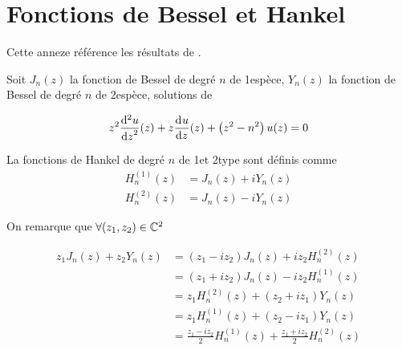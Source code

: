 \section{Fonctions de Bessel et Hankel}

Cette anneze référence les résultats de \cite{abramowitz_handbook_1964}.

Soit \(J_n(z)\) la fonction de Bessel de degré \(n\) de 1\iere espèce, \(Y_n(z)\) la fonction de Bessel de degré \(n\) de 2\ieme espèce, solutions de

\begin{equation}
    z^2 \ddp[2]{z}{u}(z) + z\ddp{z}{u}(z)+\left(z^2-n^2\right)u(z) = 0
\end{equation}

La fonctions de Hankel de degré \(n\) de 1\iere et 2\ieme type sont définis comme
\begin{align}
    H_n^{(1)}(z) &= J_n(z) + iY_n(z)\\
    H_n^{(2)}(z) &= J_n(z) - iY_n(z)
\end{align}

On remarque que \(\forall (z_1,z_2) \in \CC^2\)

\begin{equation}
\begin{aligned}
z_1 J_n(z) + z_2 Y_n(z) 
&= ( z_1 - i z_2 ) J_n(z) + iz_2 H_n^{(2)}(z) \\
&= ( z_1 + i z_2 ) J_n(z) - iz_2 H_n^{(1)}(z) \\
&= z_1 H_n^{(2)}(z) + ( z_2 + i z_1 ) Y_n(z) \\
&= z_1 H_n^{(1)}(z) + ( z_2 - i z_1 ) Y_n(z) \\
&= \frac{z_1-iz_2}{2}H_n^{(1)}(z) + \frac{z_1+iz_2}{2}H_n^{(2)}(z)
\end{aligned}
\label{eq:annex:bessel:equiv_bessel}
\end{equation}